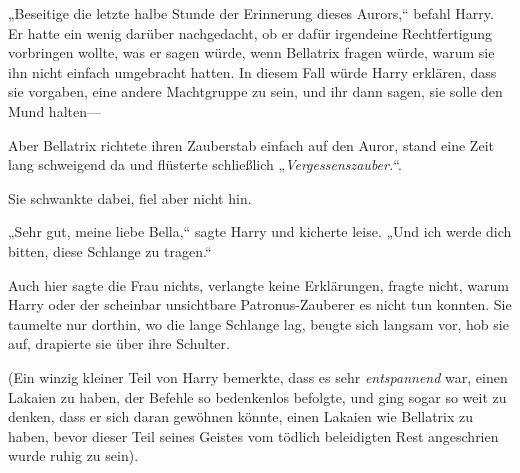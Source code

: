 „Beseitige die letzte halbe Stunde der Erinnerung dieses Aurors,“ befahl Harry. Er hatte ein wenig darüber nachgedacht, ob er dafür irgendeine Rechtfertigung vorbringen wollte, was er sagen würde, wenn Bellatrix fragen würde, warum sie ihn nicht einfach umgebracht hatten. In diesem Fall würde Harry erklären, dass sie vorgaben, eine andere Machtgruppe zu sein, und ihr dann sagen, sie solle den Mund halten—

Aber Bellatrix richtete ihren Zauberstab einfach auf den Auror, stand eine Zeit lang schweigend da und flüsterte schließlich „\emph{Vergessenszauber.}“.

Sie schwankte dabei, fiel aber nicht hin.

„Sehr gut, meine liebe Bella,“ sagte Harry und kicherte leise. „Und ich werde dich bitten, diese Schlange zu tragen.“

Auch hier sagte die Frau nichts, verlangte keine Erklärungen, fragte nicht, warum Harry oder der scheinbar unsichtbare Patronus-Zauberer es nicht tun konnten. Sie taumelte nur dorthin, wo die lange Schlange lag, beugte sich langsam vor, hob sie auf, drapierte sie über ihre Schulter.

(Ein winzig kleiner Teil von Harry bemerkte, dass es sehr \emph{entspannend} war, einen Lakaien zu haben, der Befehle so bedenkenlos befolgte, und ging sogar so weit zu denken, dass er sich daran gewöhnen könnte, einen Lakaien wie Bellatrix zu haben, bevor dieser Teil seines Geistes vom tödlich beleidigten Rest angeschrien wurde ruhig zu sein).

